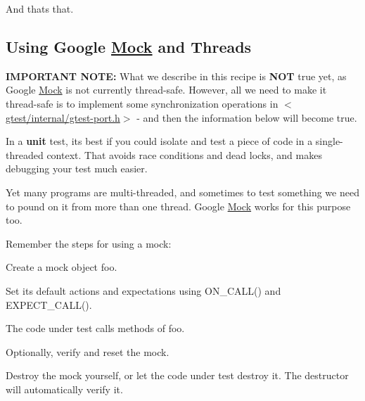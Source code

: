 And that\textquotesingle{}s that.

\subsection*{Using Google \mbox{\hyperlink{class_mock}{Mock}} and Threads}

{\bfseries{I\+M\+P\+O\+R\+T\+A\+NT N\+O\+TE\+:}} What we describe in this recipe is {\bfseries{N\+OT}} true yet, as Google \mbox{\hyperlink{class_mock}{Mock}} is not currently thread-\/safe. However, all we need to make it thread-\/safe is to implement some synchronization operations in {\ttfamily $<$\mbox{\hyperlink{gtest-port_8h_source}{gtest/internal/gtest-\/port.\+h}}$>$} -\/ and then the information below will become true.

In a {\bfseries{unit}} test, it\textquotesingle{}s best if you could isolate and test a piece of code in a single-\/threaded context. That avoids race conditions and dead locks, and makes debugging your test much easier.

Yet many programs are multi-\/threaded, and sometimes to test something we need to pound on it from more than one thread. Google \mbox{\hyperlink{class_mock}{Mock}} works for this purpose too.

Remember the steps for using a mock\+:


\begin{DoxyEnumerate}
\item Create a mock object {\ttfamily foo}.
\end{DoxyEnumerate}
\begin{DoxyEnumerate}
\item Set its default actions and expectations using {\ttfamily O\+N\+\_\+\+C\+A\+L\+L()} and {\ttfamily E\+X\+P\+E\+C\+T\+\_\+\+C\+A\+L\+L()}.
\end{DoxyEnumerate}
\begin{DoxyEnumerate}
\item The code under test calls methods of {\ttfamily foo}.
\end{DoxyEnumerate}
\begin{DoxyEnumerate}
\item Optionally, verify and reset the mock.
\end{DoxyEnumerate}
\begin{DoxyEnumerate}
\item Destroy the mock yourself, or let the code under test destroy it. The destructor will automatically verify it.
\end{DoxyEnumerate}

